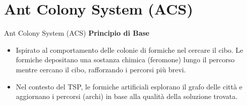 \documentclass{beamer}
\begin{document}
\section{Ant Colony System (ACS)}
\begin{frame}{Ant Colony System (ACS)}
    \textbf{Principio di Base}
    \begin{itemize}
        \item Ispirato al comportamento delle colonie di formiche nel cercare il cibo. Le formiche depositano una sostanza chimica (feromone) lungo il percorso mentre cercano il cibo, rafforzando i percorsi più brevi.
        \item Nel contesto del TSP, le formiche artificiali esplorano il grafo delle città e aggiornano i percorsi (archi) in base alla qualità della soluzione trovata.
    \end{itemize}


\end{frame}
\end{document}
